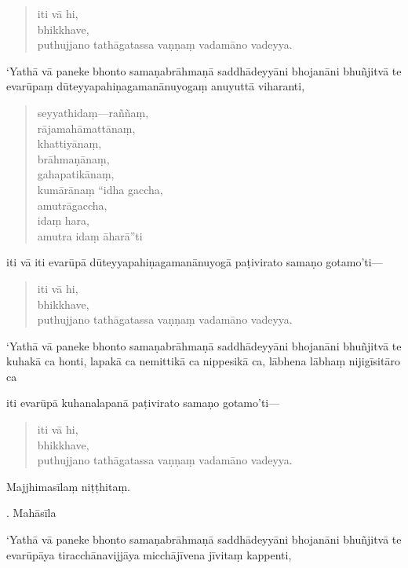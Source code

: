 \documentclass[11pt,twoside,openright]{book}
\begin{document}
\begin{verse}
iti vā hi,\\
\vin  bhikkhave,\\
\vin  puthujjano tathāgatassa vaṇṇaṃ vadamāno vadeyya.

\end{verse}
\pstart
‘Yathā vā paneke bhonto samaṇabrāhmaṇā saddhādeyyāni bhojanāni bhuñjitvā te evarūpaṃ dūteyyapahiṇagamanānuyogaṃ anuyuttā viharanti,
\pend

\begin{verse}
seyyathidaṃ—raññaṃ,\\
\vin  rājamahāmattānaṃ,\\
\vin  khattiyānaṃ,\\
\vin  brāhmaṇānaṃ,\\
\vin  gahapatikānaṃ,\\
\vin  kumārānaṃ “idha gaccha,\\
\vin  amutrāgaccha,\\
\vin  idaṃ hara,\\
\vin  amutra idaṃ āharā”ti

\end{verse}
\pstart
iti vā iti evarūpā dūteyyapahiṇagamanānuyogā paṭivirato samaṇo gotamo’ti—
\pend

\begin{verse}
iti vā hi,\\
\vin  bhikkhave,\\
\vin  puthujjano tathāgatassa vaṇṇaṃ vadamāno vadeyya.

\end{verse}
\pstart
‘Yathā vā paneke bhonto samaṇabrāhmaṇā saddhādeyyāni bhojanāni bhuñjitvā te kuhakā ca honti, lapakā ca nemittikā ca nippesikā ca, lābhena lābhaṃ nijigīsitāro ca
\pend

\pstart
iti evarūpā kuhanalapanā paṭivirato samaṇo gotamo’ti—
\pend

\begin{verse}
iti vā hi,\\
\vin  bhikkhave,\\
\vin  puthujjano tathāgatassa vaṇṇaṃ vadamāno vadeyya.

\end{verse}
\pstart
Majjhimasīlaṃ niṭṭhitaṃ.
\pend

. Mahāsīla
\pend

\pstart
‘Yathā vā paneke bhonto samaṇabrāhmaṇā saddhādeyyāni bhojanāni bhuñjitvā te evarūpāya tiracchānavijjāya micchājīvena jīvitaṃ kappenti,
\pend
\end{document}
